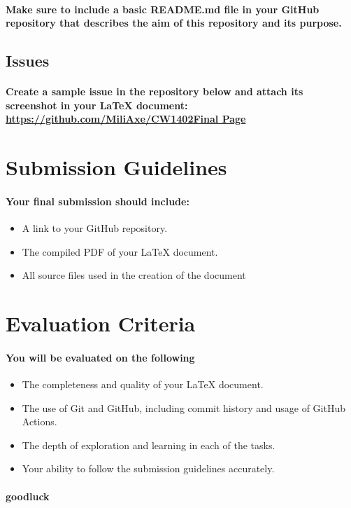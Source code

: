 \documentclass{article}
\begin{document}
\paragraph{Make sure to include a basic README.md file in your GitHub repository that describes
the aim of this repository and its purpose.}
\subsection{Issues}
\paragraph{Create a sample issue in the repository below and attach its screenshot in your LaTeX
document:\\
\url{https://github.com/MiliAxe/CW1402Final
Page}}
\section*{Submission Guidelines}
\paragraph{Your final submission should include:}
\begin{itemize}
    \item A link to your GitHub repository.
\item  The compiled PDF of your LaTeX document.
\item  All source files used in the creation of the document
\end{itemize}
\section{Evaluation Criteria}
\paragraph{You will be evaluated on the following}
\begin{itemize}
    \item The completeness and quality of your LaTeX document.
\item The use of Git and GitHub, including commit history and usage of GitHub Actions.
\item The depth of exploration and learning in each of the tasks.
\item Your ability to follow the submission guidelines accurately.
\end{itemize}
\paragraph{goodluck}
\end{document}
